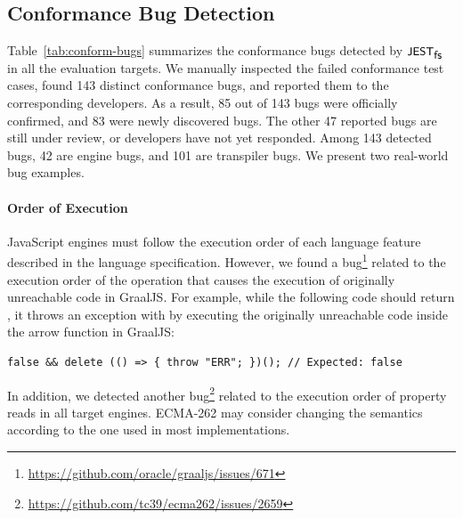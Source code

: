 

\subsection{Conformance Bug Detection}\label{sec:conform-bug}


Table~\ref{tab:conform-bugs} summarizes the conformance bugs
detected by $\textsf{\small JEST}_{\textsf{\small fs}}$ in all the evaluation targets.
We manually inspected the failed conformance test cases,
found 143 distinct conformance bugs, and reported them to
the corresponding developers.
%
As a result, 85 out of 143 bugs were officially confirmed, and
83 were newly discovered bugs.
%
The other 47 reported bugs are still under review, or developers have
not yet responded.
%
Among 143 detected bugs, 42 are engine bugs, and 101 are
transpiler bugs.
We present two real-world bug examples.


\paragraph{\textbf{Order of Execution}}
%
JavaScript engines must follow the execution order of each language feature
described in the language specification.
%
However, we found a bug\footnote{
  \url{https://github.com/oracle/graaljs/issues/671}
} related to the execution order of the  operation that causes
the execution of originally unreachable code in GraalJS.
%
For example, while the following code should return , it throws an
exception with  by executing the originally unreachable code
inside the arrow function in GraalJS:
%
\begin{lstlisting}[style=JS, basicstyle=\footnotesize\ttfamily]
    false && delete (() => { throw "ERR"; })(); // Expected: false
\end{lstlisting}
%
In addition, we detected another bug\footnote{
  \url{https://github.com/tc39/ecma262/issues/2659} %
} related to the execution order of property reads
%
%
%
in all target engines. ECMA-262 may consider changing the semantics
according to the one used in most implementations.

